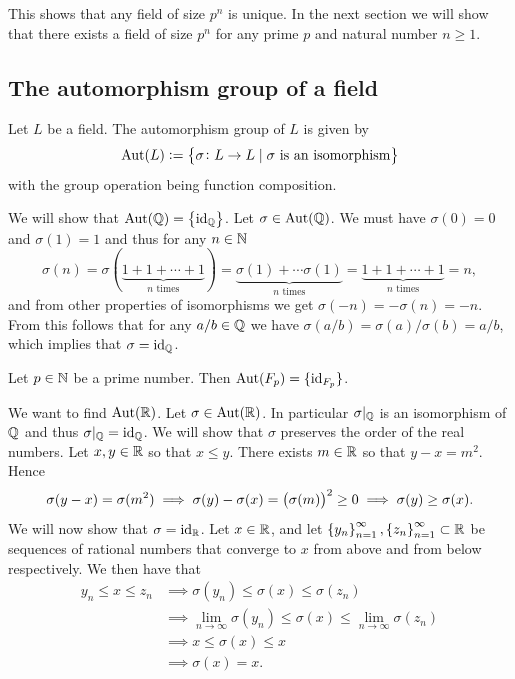 \documentclass[11pt,a4paper]{article}
\begin{document}
\begin{remark}
  This shows that any field of size $p^n$ is unique.
  In the next section we will show that there exists a field of size $p^n$
  for any prime $p$ and natural number $n \geq 1$.
\end{remark}

\subsection{The automorphism group of a field}
\begin{definition}
  Let $L$ be a field.
  The automorphism group of $L$ is given by
  \[
    \operatorname{Aut}(L) :=
    \left\{\sigma \colon L \to L \mid \sigma \text{ is an isomorphism}\right\}
  \]
  with the group operation being function composition.
\end{definition}

\begin{example}
  We will show that $\operatorname{Aut}(\mathbb{Q}) = \left\{\operatorname{id}_{\mathbb{Q}}\right\}$.
  Let $\sigma \in \operatorname{Aut}(\mathbb{Q})$.
  We must have $\sigma(0) = 0$ and $\sigma(1) = 1$ and thus for any $n \in \mathbb{N}$
  \[
    \sigma(n) =
    \sigma(\underbrace{1 + 1 + \cdots + 1}_{n \text{ times}}) =
    \underbrace{\sigma(1) + \cdots \sigma(1)}_{n \text{ times}} =
    \underbrace{1 + 1 + \cdots + 1}_{n \text{ times}} = n,
  \]
  and from other properties of isomorphisms we get
  $\sigma(-n) = - \sigma(n) = -n$.
  From this follows that for any $a/b \in \mathbb{Q}$ we have
  $\sigma(a/b) = \sigma(a)/\sigma(b) = a/b$,
  which implies that $\sigma = \operatorname{id}_{\mathbb{Q}}$.
\end{example}

\begin{example}
  Let $p \in \mathbb{N}$ be a prime number.
  Then $\operatorname{Aut}(F_p) = \{\operatorname{id}_{F_p}\}$.
\end{example}

\begin{example}
  We want to find $\operatorname{Aut}(\mathbb{R})$.
  Let $\sigma \in \operatorname{Aut}(\mathbb{R})$.
  In particular $\sigma\vert_{\mathbb{Q}}$ is an isomorphism of $\mathbb{Q}$ and thus
  $\sigma\vert_{\mathbb{Q}} = \operatorname{id}_{\mathbb{Q}}$.
  We will show that $\sigma$ preserves the order of the real numbers.
  Let $x,y \in \mathbb{R}$ so that $x \le y$.
  There exists $m \in \mathbb{R}$ so that $y - x = m^2$.
  Hence
  \[
    \sigma(y - x) = \sigma(m^2) \implies
    \sigma(y) - \sigma(x) = \del{\sigma(m)}^2 \geq 0 \implies
    \sigma(y) \geq \sigma(x).
  \]
  We will now show that $\sigma = \operatorname{id}_{\mathbb{R}}$.
  Let $x \in \mathbb{R}$, and let
  $\left\{y_n\right\}_{n=1}^{\infty},\left\{z_n\right\}_{n=1}^{\infty} \subset \mathbb{R}$
  be sequences of rational numbers that converge to $x$ from above
  and from below respectively.
  We then have that
  \begin{align*}
    y_n \le x \le z_n &\implies
    \sigma(y_n) \le \sigma(x) \le \sigma(z_n) \\ &\implies
    \lim_{n \to \infty} \sigma(y_n) \le \sigma(x) \le
    \lim_{n \to \infty} \sigma(z_n) \\ &\implies
    x \le \sigma(x) \le x \\& \implies \sigma(x) = x.
  \end{align*}
\end{example}
\end{document}
